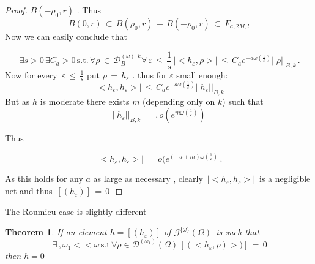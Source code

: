 \documentclass[12pt,a4paper]{amsart}
\newtheorem{theorem}{Theorem}[section]
\begin{document}
\begin{proof}
$B(-\rho_0 , r)$ . Thus 
$$ \,B(0,r) \,\subset \,B(\rho_0 , r)\,+\,B(-\rho_0,r)\,
\subset\,F_{a,2M,l}\,$$
Now we can easily conclude that
 
 
 
  
  $$\,\exists s>0\, \exists C_a>0\,\mbox{s.t.}\,\forall \rho \,\in \,
  \mathcal{D}_B^{(\omega),k}
  \forall\, \varepsilon \,\leq\,
  \frac{1}{s}\,
  |<h_\varepsilon,\rho>|\,\leq \,
  C_a e^{-a\omega(\frac{1}{\varepsilon})} ||\rho||_{B,k} \,.
  $$  
  Now for every $\,\varepsilon\,\leq \,\frac{1}{s}$ 
   put $\rho\,=\,h_\varepsilon$ . thus for $\varepsilon$ small enough:
   \begin{equation*}
  |<h_\varepsilon,h_\varepsilon>|\,\leq \,
  C_a e^{-a\omega(\frac{1}{\varepsilon})} ||h_\varepsilon||_{B,k} 
 \end{equation*}
 But as $h$ is moderate there exists $m$ (depending only  on $k$)
 such that  $$ ||h_\varepsilon||_{B,k}\,=\
 ,o(e^{m\omega(\frac{1}{\varepsilon})}) $$
 
 Thus 
 
 
 
 $$|<h_\varepsilon,h_\varepsilon>|\,
 =\,o(e^{(-a+m)\omega(\frac{1}{\varepsilon})} \,.$$
 
 As this holds for any $a$ as large as necessary , clearly 
 $\,|<h_\varepsilon,h_\varepsilon>|\,$ is a negligible net and thus $\,[(h_\varepsilon)] \,=\,0\,$ 
 
 \end{proof}
 
 The Roumieu case is slightly different  
 
 \begin{theorem}
   If an element $h=[(h_\varepsilon)]$ of
 $\mathcal{G}^{\{\omega\}}(\Omega) \,$ is such that 
 $$\,\exists \,,\omega_1 <<\omega \,\mbox{s.t} \, \forall \rho 
 \in \mathcal{D}^{(\omega_1)}(\Omega)\,
 [(<h_\varepsilon,\rho)>)]\,=\,0  $$
 then $h=0$
 \end{theorem}
 
\end{document}

